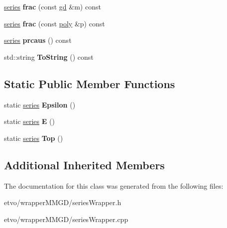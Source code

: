 \begin{DoxyCompactItemize}
\item 
\mbox{\label{classetvo_i_i_1_1series_af31254e3923593918c2f3791a29e9cd3}} 
\mbox{\hyperlink{classetvo_i_i_1_1series}{series}} {\bfseries frac} (const \mbox{\hyperlink{classetvo_i_i_1_1gd}{gd}} \&m) const
\item 
\mbox{\label{classetvo_i_i_1_1series_a5124cc9bbc7745be2970479c0a588052}} 
\mbox{\hyperlink{classetvo_i_i_1_1series}{series}} {\bfseries frac} (const \mbox{\hyperlink{classetvo_i_i_1_1poly}{poly}} \&p) const
\item 
\mbox{\label{classetvo_i_i_1_1series_a448c9581ed8ca63c795688aa1934c732}} 
\mbox{\hyperlink{classetvo_i_i_1_1series}{series}} {\bfseries prcaus} () const
\item 
\mbox{\label{classetvo_i_i_1_1series_ad2101fcedbcb3e986ec5602910cb7dee}} 
std\+::string {\bfseries To\+String} () const
\end{DoxyCompactItemize}
\subsection*{Static Public Member Functions}
\begin{DoxyCompactItemize}
\item 
\mbox{\label{classetvo_i_i_1_1series_a4b61c527cbbb5c9365b1912f2d7f700d}} 
static \mbox{\hyperlink{classetvo_i_i_1_1series}{series}} {\bfseries Epsilon} ()
\item 
\mbox{\label{classetvo_i_i_1_1series_a7ef500cc122204d82fe762e5aa260939}} 
static \mbox{\hyperlink{classetvo_i_i_1_1series}{series}} {\bfseries E} ()
\item 
\mbox{\label{classetvo_i_i_1_1series_a8217c82caf53fb5cc403240b1d8b0668}} 
static \mbox{\hyperlink{classetvo_i_i_1_1series}{series}} {\bfseries Top} ()
\end{DoxyCompactItemize}
\subsection*{Additional Inherited Members}


The documentation for this class was generated from the following files\+:\begin{DoxyCompactItemize}
\item 
etvo/wrapper\+M\+M\+G\+D/series\+Wrapper.\+h\item 
etvo/wrapper\+M\+M\+G\+D/series\+Wrapper.\+cpp\end{DoxyCompactItemize}
